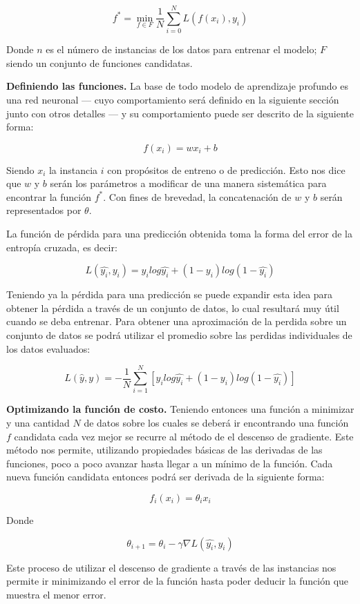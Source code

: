 $$f^* = \min_{f \in F} \frac{1}{N} \sum_{i = 0}^{N} L(f(x_i), y_i)$$

Donde $n$ es el número de instancias de los datos para entrenar el modelo; $F$ siendo un conjunto de funciones candidatas.

\textbf{Definiendo las funciones.} La base de todo modelo de aprendizaje profundo es una red neuronal --- cuyo comportamiento será definido en la siguiente sección junto con otros detalles --- y su comportamiento puede ser descrito de la siguiente forma:

$$ f(x_i) = w x_i + b $$

Siendo $x_i$ la instancia $i$ con propósitos de entreno o de predicción. Esto nos dice que $w$ y $b$ serán los parámetros a modificar de una manera sistemática para encontrar la función $f^*$. Con fines de brevedad, la concatenación de $w$ y $b$ serán representados por $\theta$.

La función de pérdida para una predicción obtenida toma la forma del error de la entropía cruzada, es decir:

$$ L(\hat{y_i}, y_i) = y_i log\hat{y_i} + (1 - y_i)log(1 - \hat{y_i}) $$

Teniendo ya la pérdida para una predicción se puede expandir esta idea para obtener la pérdida a través de un conjunto de datos, lo cual resultará muy útil cuando se deba entrenar. Para obtener una aproximación de la perdida sobre un conjunto de datos se podrá utilizar el promedio sobre las perdidas individuales de los datos evaluados:

$$ L(\hat{y}, y) = - \frac{1}{N} \sum_{i = 1}^{N} [y_i log\hat{y_i} + (1 - y_i)log(1 - \hat{y_i})] $$

\textbf{Optimizando la función de costo.} Teniendo entonces una función a minimizar y una cantidad $N$ de datos sobre los cuales se deberá ir encontrando una función $f$ candidata cada vez mejor se recurre al método de el descenso de gradiente. Este método nos permite, utilizando propiedades básicas de las derivadas de las funciones, poco a poco avanzar hasta llegar a un mínimo de la función. Cada nueva función candidata entonces podrá ser derivada de la siguiente forma:

$$ f_i(x_i) = \theta_i x_i $$

Donde

$$ \theta_{i + 1} = \theta_{i} - \gamma \nabla L(\hat{y_i}, y_i) $$

Este proceso de utilizar el descenso de gradiente a través de las instancias nos permite ir minimizando el error de la función hasta poder deducir la función que muestra el menor error.

